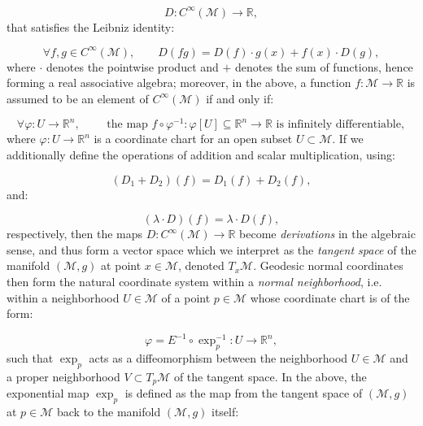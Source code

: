 \documentclass{article}
\begin{document}
\begin{equation}
D : C^{\infty} \left( \mathcal{M} \right) \to \mathbb{R},
\end{equation}
that satisfies the Leibniz identity:

\begin{equation}
\forall f, g \in C^{\infty} \left( \mathcal{M} \right), \qquad D \left( f g \right) = D \left( f \right) \cdot g \left( x \right) + f \left( x \right) \cdot D \left( g \right),
\end{equation}
where ${\cdot}$ denotes the pointwise product and ${+}$ denotes the sum of functions, hence forming a real associative algebra; moreover, in the above, a function ${f : \mathcal{M} \to \mathbb{R}}$ is assumed to be an element of ${C^{\infty} \left( \mathcal{M} \right)}$ if and only if:

\begin{equation}
\forall \varphi : U \to \mathbb{R}^n, \qquad \text{ the map } f \circ \varphi^{-1} : \varphi \left[ U \right] \subseteq \mathbb{R}^n \to \mathbb{R} \text{ is infinitely differentiable},
\end{equation}
where ${\varphi : U \to \mathbb{R}^n}$ is a coordinate chart for an open subset ${U \subset \mathcal{M}}$. If we additionally define the operations of addition and scalar multiplication, using:

\begin{equation}
\left( D_1 + D_2 \right) \left( f \right) = D_1 \left( f \right) + D_2 \left( f \right),
\end{equation}
and:

\begin{equation}
\left( \lambda \cdot D \right) \left( f \right) = \lambda \cdot D \left( f \right),
\end{equation}
respectively, then the maps ${D : C^{\infty} \left( \mathcal{M} \right) \to \mathbb{R}}$ become \textit{derivations} in the algebraic sense, and thus form a vector space which we interpret as the \textit{tangent space} of the manifold ${\left( \mathcal{M}, g \right)}$ at point ${x \in \mathcal{M}}$, denoted ${T_x \mathcal{M}}$. Geodesic normal coordinates then form the natural coordinate system within a \textit{normal neighborhood}, i.e. within a neighborhood ${U \in \mathcal{M}}$ of a point ${p \in \mathcal{M}}$ whose coordinate chart is of the form:

\begin{equation}
\varphi = E^{-1} \circ \exp_{p}^{-1} : U \to \mathbb{R}^n,
\end{equation}
such that ${\exp_p}$ acts as a diffeomorphism between the neighborhood ${U \in \mathcal{M}}$ and a proper neighborhood ${V \subset T_p \mathcal{M}}$ of the tangent space. In the above, the exponential map ${\exp_p}$ is defined as the map from the tangent space of ${\left( \mathcal{M}, g \right)}$ at ${p \in \mathcal{M}}$ back to the manifold ${\left( \mathcal{M}, g \right)}$ itself:
\end{document}
